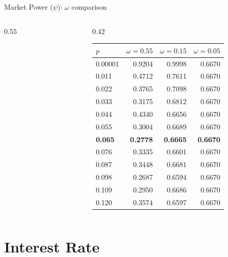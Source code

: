 \documentclass[aspectratio=169,10pt]{beamer}
\begin{document}
\begin{frame}{Market Power ($\psi$): $\omega$ comparison}
\begin{columns}[T]
\begin{column}{0.55\textwidth}
\begin{figure}
      \end{figure}
    \end{column}
    \begin{column}{0.42\textwidth}
      \footnotesize\renewcommand{\arraystretch}{0.85}\setlength{\tabcolsep}{3pt}
      \begin{tabular}{lrrr}
        \toprule
        $p$ & $\omega=0.55$ & $\omega=0.15$ & $\omega=0.05$ \\
        \midrule
        0.00001 & 0.9204 & 0.9998 & 0.6670 \\
        0.011 & 0.4712 & 0.7611 & 0.6670 \\
        0.022 & 0.3765 & 0.7098 & 0.6670 \\
        0.033 & 0.3175 & 0.6812 & 0.6670 \\
        0.044 & 0.4340 & 0.6656 & 0.6670 \\
        0.055 & 0.3004 & 0.6689 & 0.6670 \\
        \textbf{0.065} & \textbf{0.2778} & \textbf{0.6665} & \textbf{0.6670} \\
        0.076 & 0.3335 & 0.6601 & 0.6670 \\
        0.087 & 0.3448 & 0.6681 & 0.6670 \\
        0.098 & 0.2687 & 0.6594 & 0.6670 \\
        0.109 & 0.2950 & 0.6686 & 0.6670 \\
        0.120 & 0.3574 & 0.6597 & 0.6670 \\
        \bottomrule
      \end{tabular}
    \end{column}
  \end{columns}
\end{frame}

\section{Interest Rate}
\end{document}
